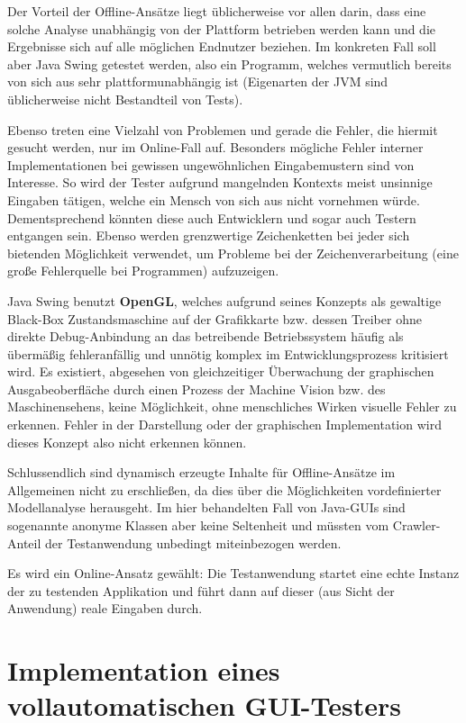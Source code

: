 Der Vorteil der Offline-Ansätze liegt üblicherweise vor allen darin, dass eine solche Analyse unabhängig von der
Plattform betrieben werden kann und die Ergebnisse sich auf alle möglichen Endnutzer beziehen.
Im konkreten Fall soll aber Java Swing getestet werden, also ein Programm, welches vermutlich
bereits von sich aus sehr plattformunabhängig ist (Eigenarten der JVM sind üblicherweise nicht
Bestandteil von Tests).

Ebenso treten eine Vielzahl von Problemen und gerade die Fehler, die hiermit gesucht werden,
nur im Online-Fall auf. Besonders mögliche Fehler interner Implementationen bei gewissen ungewöhnlichen
Eingabemustern sind von Interesse. So wird der Tester aufgrund mangelnden Kontexts meist unsinnige
Eingaben tätigen, welche ein Mensch von sich aus nicht vornehmen würde. Dementsprechend könnten
diese auch Entwicklern und sogar auch Testern entgangen sein. Ebenso werden grenzwertige
Zeichenketten bei jeder sich bietenden Möglichkeit verwendet, um Probleme bei der Zeichenverarbeitung
(eine große Fehlerquelle bei Programmen) aufzuzeigen.

Java Swing benutzt \textbf{OpenGL}\label{openglQQ}, welches aufgrund seines Konzepts als gewaltige
Black-Box Zustandsmaschine auf der Grafikkarte bzw. dessen Treiber
ohne direkte Debug-Anbindung an das betreibende Betriebssystem
häufig als übermäßig fehleranfällig und unnötig komplex im Entwicklungsprozess kritisiert wird.
Es existiert, abgesehen von gleichzeitiger Überwachung der graphischen Ausgabeoberfläche
durch einen Prozess der \glqq{}Machine Vision\grqq{} bzw. des Maschinensehens, keine Möglichkeit,
ohne menschliches Wirken visuelle Fehler zu erkennen. Fehler in der Darstellung oder
der graphischen Implementation wird dieses Konzept also nicht erkennen können.

Schlussendlich sind dynamisch erzeugte Inhalte für Offline-Ansätze im Allgemeinen
nicht zu erschließen, da dies über die Möglichkeiten vordefinierter Modellanalyse herausgeht.
Im hier behandelten Fall von Java-GUIs sind sogenannte anonyme Klassen aber keine
Seltenheit und müssten vom Crawler-Anteil der Testanwendung unbedingt miteinbezogen werden.

Es wird ein Online-Ansatz gewählt: Die Testanwendung startet eine echte Instanz
der zu testenden Applikation und führt dann auf dieser (aus Sicht der Anwendung) reale
Eingaben durch.


\section{Implementation eines vollautomatischen GUI-Testers}\label{section:myfullautoguitest}


